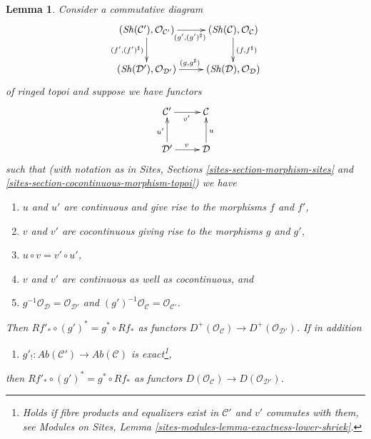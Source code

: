 \documentclass[10pt,a4paper]{amsart}
\theoremstyle{plain}
\newtheorem{lemma}[subsection]{Lemma}
\theoremstyle{definition}
\theoremstyle{remark}
\numberwithin{equation}{subsection}
\def\Sh{\mathop{\mathit{Sh}}\nolimits}
\begin{document}
\begin{lemma}
\label{lemma-special-square-continuous}
Consider a commutative diagram
$$
\xymatrix{
(\Sh(\mathcal{C}'), \mathcal{O}_{\mathcal{C}'})
\ar[r]_{(g', (g')^\sharp)} \ar[d]_{(f', (f')^\sharp)} &
(\Sh(\mathcal{C}), \mathcal{O}_\mathcal{C}) \ar[d]^{(f, f^\sharp)} \\
(\Sh(\mathcal{D}'), \mathcal{O}_{\mathcal{D}'}) \ar[r]^{(g, g^\sharp)} &
(\Sh(\mathcal{D}), \mathcal{O}_\mathcal{D})
}
$$
of ringed topoi and suppose we have functors
$$
\xymatrix{
\mathcal{C}' \ar[r]_{v'} &
\mathcal{C} \\
\mathcal{D}' \ar[r]^v \ar[u]^{u'} &
\mathcal{D} \ar[u]_u
}
$$
such that (with notation as in
Sites, Sections \ref{sites-section-morphism-sites} and
\ref{sites-section-cocontinuous-morphism-topoi}) we have
\begin{enumerate}
\item $u$ and $u'$ are continuous and give rise to the morphisms
$f$ and $f'$,
\item $v$ and $v'$ are cocontinuous giving rise to the morphisms $g$ and $g'$,
\item $u \circ v = v' \circ u'$,
\item $v$ and $v'$ are continuous as well as cocontinuous, and
\item $g^{-1}\mathcal{O}_{\mathcal{D}} = \mathcal{O}_{\mathcal{D}'}$
and $(g')^{-1}\mathcal{O}_{\mathcal{C}} = \mathcal{O}_{\mathcal{C}'}$.
\end{enumerate}
Then $Rf'_* \circ (g')^* = g^* \circ Rf_*$ as functors
$D^+(\mathcal{O}_\mathcal{C}) \to D^+(\mathcal{O}_{\mathcal{D}'})$.
If in addition
\begin{enumerate}
\item[(6)] $g'_! : \textit{Ab}(\mathcal{C}') \to \textit{Ab}(\mathcal{C})$
is exact\footnote{Holds if fibre products and equalizers exist in
$\mathcal{C}'$ and $v'$ commutes with them, see
Modules on Sites, Lemma \ref{sites-modules-lemma-exactness-lower-shriek}.},
\end{enumerate}
then $Rf'_* \circ (g')^* = g^* \circ Rf_*$ as functors
$D(\mathcal{O}_\mathcal{C}) \to D(\mathcal{O}_{\mathcal{D}'})$.
\end{lemma}
\end{document}

